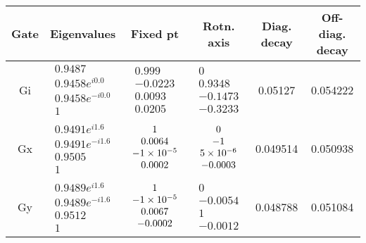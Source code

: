 {\begin{table}[h]
\begin{center}
\begin{tabular}[l]{|c|c|c|c|c|c|}
\hline
Gate & Eigenvalues & Fixed pt & Rotn. axis & Diag. decay & Off-diag. decay \\ \hline
Gi & $ \begin{array}{c}
0.9487 \\ 
0.9458e^{i0.0} \\ 
0.9458e^{-i0.0} \\ 
1
 \end{array} $
 & $ \begin{array}{c}
0.999 \\ 
-0.0223 \\ 
0.0093 \\ 
0.0205
 \end{array} $
 & $ \begin{array}{c}
0 \\ 
0.9348 \\ 
-0.1473 \\ 
-0.3233
 \end{array} $
 & 0.05127 & 0.054222 \\ \hline
Gx & $ \begin{array}{c}
0.9491e^{i1.6} \\ 
0.9491e^{-i1.6} \\ 
0.9505 \\ 
1
 \end{array} $
 & $ \begin{array}{c}
1 \\ 
0.0064 \\ 
-1\times 10^{-5} \\ 
0.0002
 \end{array} $
 & $ \begin{array}{c}
0 \\ 
-1 \\ 
5\times 10^{-6} \\ 
-0.0003
 \end{array} $
 & 0.049514 & 0.050938 \\ \hline
Gy & $ \begin{array}{c}
0.9489e^{i1.6} \\ 
0.9489e^{-i1.6} \\ 
0.9512 \\ 
1
 \end{array} $
 & $ \begin{array}{c}
1 \\ 
-1\times 10^{-5} \\ 
0.0067 \\ 
-0.0002
 \end{array} $
 & $ \begin{array}{c}
0 \\ 
-0.0054 \\ 
1 \\ 
-0.0012
 \end{array} $
 & 0.048788 & 0.051084 \\ \hline
\end{tabular}


\end{center}
\end{table}}
